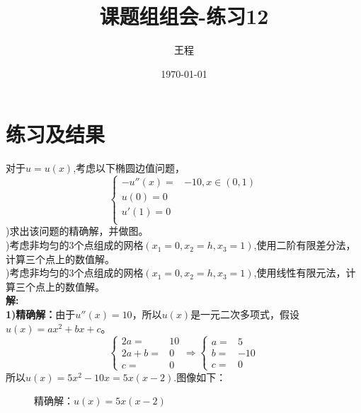 \documentclass[a4paper,11pt,UTF8]{article}%
\theoremstyle{plain}
\begin{document}
	\title{\heiti 课题组组会-练习12}
	\author{王程 }
	\date{\today}
	\maketitle
	
	\section{练习及结果}
对于$u=u\left(x\right)$,考虑以下椭圆边值问题，\\
$$\left\{
\begin{aligned}
  -u''\left(x\right)=&-10, x\in\left(0,1\right)\\
  u\left(0\right)=0\\
  u'\left(1\right)=0\\
\end{aligned}
\right.$$
)求出该问题的精确解，并做图。\\
)考虑非均匀的3个点组成的网格$\left(x_1=0,x_2=h,x_3=1\right)$,使用二阶有限差分法，计算三个点上的数值解。\\
)考虑非均匀的3个点组成的网格$\left(x_1=0,x_2=h,x_3=1\right)$,使用线性有限元法，计算三个点上的数值解。\\
	
	
	
	\clearpage
	\noindent \textbf{解:}\\
	\indent \textbf{1)精确解：}由于$u''\left(x\right)=10$，所以$u\left(x\right)$是一元二次多项式，假设$u\left(x\right)=ax^2+bx+c$。\\
	$$\left\{
	\begin{aligned}
		2a=&10\\
		2a+b=&0\\
		c=&0
	\end{aligned}\right.
	\Rightarrow
	\left\{
	\begin{aligned}
		a=&5\\
		b=&-10\\
		c=&0
	\end{aligned}
	\right.
	$$
	所以$u\left(x\right)=5x^2-10x=5x\left(x-2\right)$.图像如下：\\
			\begin{figure}[H]
		\centering
		\caption{精确解：$u\left(x\right)=5x\left(x-2\right)$}
	\end{figure}\leavevmode\\
	
\end{document}

